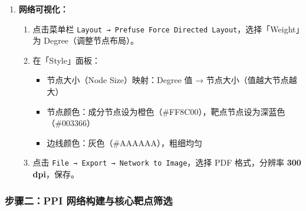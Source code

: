 \documentclass[12pt,a4paper,twoside]{article}
\newcommand{\clickpath}[1]{\texttt{#1}}
\begin{document}
\begin{enumerate}
  \item \textbf{网络可视化：}
    \begin{enumerate}
      \item 点击菜单栏 \clickpath{Layout → Prefuse Force Directed Layout}，选择「Weight」为 Degree（调整节点布局）。
      \item 在「Style」面板：
        \begin{itemize}
          \item 节点大小（Node Size）映射：Degree 值 → 节点大小（值越大节点越大）
          \item 节点颜色：成分节点设为橙色（\#FF8C00），靶点节点设为深蓝色（\#003366）
          \item 边线颜色：灰色（\#AAAAAA），粗细均匀
        \end{itemize}
      \item 点击 \clickpath{File → Export → Network to Image}，选择 PDF 格式，分辨率 \textbf{300 dpi}，保存。
    \end{enumerate}
\end{enumerate}

\subsubsection{步骤二：PPI 网络构建与核心靶点筛选}
\end{document}
